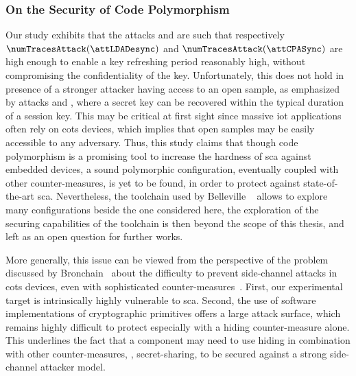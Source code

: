 \subsubsection{On the Security of Code Polymorphism}
\label{sec:certification}
Our study exhibits that the attacks \attLDADesync{} and \attCPASync{} are such that respectively \(\numTracesAttack(\attLDADesync)\) and \(\numTracesAttack(\attCPASync)\) are high enough to enable a key refreshing period reasonably high, without compromising the confidentiality of the key.
Unfortunately, this does not hold in presence of a stronger attacker having access to an open sample, as emphasized by attacks \attLDASync{} and \attCNN{}, where a secret key can be recovered within the typical duration of a session key.
This may be critical at first sight since massive \gls{iot} applications often rely on \gls{cots} devices, which implies that open samples may be easily accessible to any adversary.
Thus, this study claims that though code polymorphism is a promising tool to increase the hardness of \gls{sca} against embedded devices, a sound polymorphic configuration, eventually coupled with other counter-measures, is yet to be found, in order to protect against state-of-the-art \gls{sca}.
Nevertheless, the toolchain used by Belleville \etal{}~\cite{belleville_automated_2019} allows to explore many configurations beside the one considered here, the exploration of the securing capabilities of the toolchain is then beyond the scope of this thesis, and left as an open question for further works.

More generally, this issue can be viewed from the perspective of the problem discussed by Bronchain \etal{}\ about the difficulty to prevent side-channel attacks in \gls{cots} devices, even with sophisticated counter-measures~\cite{bronchain_dissection_2020}.
First, our experimental target is intrinsically highly vulnerable to \gls{sca}.
Second, the use of software implementations of cryptographic primitives offers a large attack surface, which remains highly difficult to protect especially with a hiding counter-measure alone.
This underlines the fact that a component may need to use hiding in combination with other counter-measures, \eg{}, secret-sharing, to be secured against a strong side-channel attacker model. 